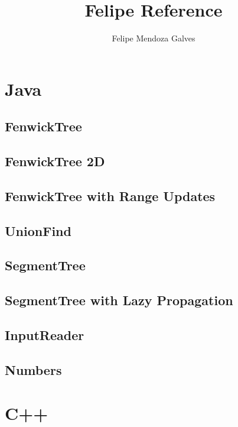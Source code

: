 \documentclass[10pt]{article}
\title{Felipe Reference}
\author{Felipe Mendoza Galves}
\date{}
\begin{document}
	
	\maketitle
	\newpage
	\tableofcontents
	\newpage
	
	\section{Java}
	\subsection{FenwickTree}
	\subsection{FenwickTree 2D}
	\subsection{FenwickTree with Range Updates}
	\subsection{UnionFind}
	\subsection{SegmentTree}
	\subsection{SegmentTree with Lazy Propagation}
	\subsection{InputReader}
	\subsection{Numbers}

	
		

	\newpage
	\section{C++}
\end{document}

